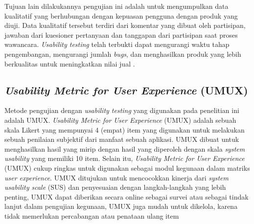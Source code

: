 \par Tujuan lain dilakukannya pengujian ini adalah untuk mengumpulkan data kualitatif yang berhubungan dengan kepuasan pengguna dengan produk yang diuji. Data kualitatif tersebut terdiri dari komentar yang dibuat oleh partisipan, jawaban dari kuesioner pertanyaan dan tanggapan dari partisipan saat proses wawancara. \textit{Usability testing} telah terbukti dapat mengurangi waktu tahap pengembangan, mengurangi jumlah \textit{bugs}, dan menghasilkan produk yang lebih berkualitas untuk meningkatkan nilai jual \citep{Wahl2000}.

\subsection{\textit{Usability Metric for User Experience }(UMUX)} Metode pengujian dengan \textit{usability testing} yang digunakan pada penelitian ini adalah UMUX. \textit{Usability Metric for User Experience} (UMUX) adalah sebuah skala Likert yang mempunyai 4 (empat) item yang digunakan untuk melakukan sebuah penilaian subjektif dari manfaat sebuah aplikasi. UMUX dibuat untuk menghasilkan hasil yang mirip dengan hasil yang diperoleh dengan skala \textit{system usability} yang memiliki 10 item. Selain itu, \textit{Usability Metric for User Experience} (UMUX) cukup ringkas untuk digunakan sebagai modul kegunaan dalam matriks \textit{user experience}. UMUX ditujukan untuk mencocokkan kinerja dari \textit{system usability scale} (SUS) dan penyesuaian dengan langkah-langkah yang lebih penting, UMUX dapat diberikan secara online sebagai survei atau sebagai tindak lanjut dalam pengujian kegunaan, UMUX juga mudah untuk dikelola, karena tidak memerlukan percabangan atau penataan ulang item \citep{Finstad2010}

